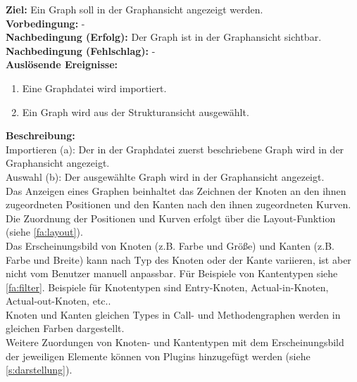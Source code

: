\label{fa:graphen}
\textbf{Ziel:} Ein Graph soll in der Graphansicht angezeigt werden.\\
\textbf{Vorbedingung:} -\\
\textbf{Nachbedingung (Erfolg):} Der Graph ist in der Graphansicht sichtbar.\\
\textbf{Nachbedingung (Fehlschlag):} -\\
\textbf{Auslösende Ereignisse:}
\begin{enumerate}[nolistsep, label=(\alph*)]
  \item Eine Graphdatei wird importiert.
  \item Ein Graph wird aus der Strukturansicht ausgewählt.
\end{enumerate}
\textbf{Beschreibung:}\\
Importieren (a): Der in der Graphdatei zuerst beschriebene Graph wird in der Graphansicht angezeigt.\\
Auswahl (b): Der ausgewählte Graph wird in der Graphansicht angezeigt.\\
Das Anzeigen eines Graphen beinhaltet das Zeichnen der Knoten an den ihnen zugeordneten Positionen und den Kanten
nach den ihnen zugeordneten Kurven.
Die Zuordnung der Positionen und Kurven erfolgt über die Layout-Funktion (siehe \ref{fa:layout}).\\
Das Erscheinungsbild von Knoten (z.B. Farbe und Größe) und Kanten (z.B. Farbe und Breite) kann nach Typ des
Knoten oder der Kante variieren, ist aber nicht vom Benutzer manuell anpassbar.
Für Beispiele von Kantentypen siehe \ref{fa:filter}. Beispiele für Knotentypen sind Entry-Knoten, Actual-in-Knoten, Actual-out-Knoten, etc..\\
Knoten und Kanten gleichen Types in Call- und Methodengraphen werden in gleichen Farben dargestellt.\\
Weitere Zuordungen von Knoten- und Kantentypen mit dem Erscheinungsbild der jeweiligen Elemente können von
Plugins hinzugefügt werden (siehe \ref{s:darstellung}).


